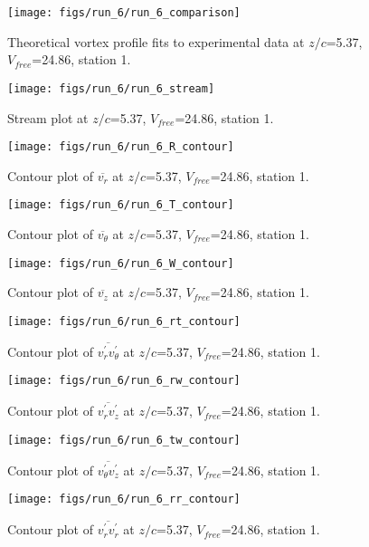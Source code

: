 \begin{figure}[H]
\centering
\texttt{[image: figs/run\_6/run\_6\_comparison]}
\caption{Theoretical vortex profile fits to experimental data at $z/c$=5.37, $V_{free}$=24.86, station 1.}
\end{figure}


\begin{figure}[H]
\centering
\texttt{[image: figs/run\_6/run\_6\_stream]}
\caption{Stream plot at $z/c$=5.37, $V_{free}$=24.86, station 1.}
\end{figure}


\begin{figure}[H]
\centering
\texttt{[image: figs/run\_6/run\_6\_R\_contour]}
\caption{Contour plot of $\overline{v_{r}}$ at $z/c$=5.37, $V_{free}$=24.86, station 1.}
\end{figure}


\begin{figure}[H]
\centering
\texttt{[image: figs/run\_6/run\_6\_T\_contour]}
\caption{Contour plot of $\overline{v_{\theta}}$ at $z/c$=5.37, $V_{free}$=24.86, station 1.}
\end{figure}


\begin{figure}[H]
\centering
\texttt{[image: figs/run\_6/run\_6\_W\_contour]}
\caption{Contour plot of $\overline{v_{z}}$ at $z/c$=5.37, $V_{free}$=24.86, station 1.}
\end{figure}


\begin{figure}[H]
\centering
\texttt{[image: figs/run\_6/run\_6\_rt\_contour]}
\caption{Contour plot of $\overline{v_{r}^{\prime} v_{\theta}^{\prime}}$ at $z/c$=5.37, $V_{free}$=24.86, station 1.}
\end{figure}


\begin{figure}[H]
\centering
\texttt{[image: figs/run\_6/run\_6\_rw\_contour]}
\caption{Contour plot of $\overline{v_{r}^{\prime} v_{z}^{\prime}}$ at $z/c$=5.37, $V_{free}$=24.86, station 1.}
\end{figure}


\begin{figure}[H]
\centering
\texttt{[image: figs/run\_6/run\_6\_tw\_contour]}
\caption{Contour plot of $\overline{v_{\theta}^{\prime} v_{z}^{\prime}}$ at $z/c$=5.37, $V_{free}$=24.86, station 1.}
\end{figure}


\begin{figure}[H]
\centering
\texttt{[image: figs/run\_6/run\_6\_rr\_contour]}
\caption{Contour plot of $\overline{v_{r}^{\prime} v_{r}^{\prime}}$ at $z/c$=5.37, $V_{free}$=24.86, station 1.}
\end{figure}


